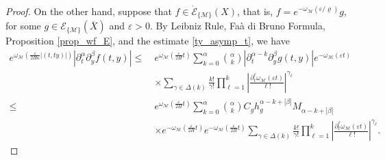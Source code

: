 \documentclass[11pt,reqno]{amsart}
\numberwithin{equation}{section}
\newcommand{\E}{{\mathcal{E}}}
\newcommand{\M}{{\mathcal{M}}} %
\newcommand{\X}{{\overline{X}}}
\begin{document}
\begin{proof}
	On the other hand, suppose that $f\in \dot{\E}_{\{\M\}}(X)$, that is, $f=e^{-\omega_\M(\varepsilon/\varrho)}g$, for some $g\in \E_{\{\M\}}(\X)$ and $\varepsilon>0$. By Leibniz Rule, Fa\`a di Bruno Formula, Proposition \ref{prop_wf_E}, and the estimate \eqref{ty_asymp_t}, we have
	\begin{align*}
		e^{\omega_\M\left(\tfrac{\varepsilon}{2H\kappa}|(t,ty)|\right)}|\partial_t^\alpha\partial_y^\beta f(t,y)| \leq\ & e^{\omega_\M \left(\tfrac{\varepsilon}{2H} t\right)} \sum_{k=0}^\alpha\binom{\alpha}{k} |\partial_t^{\alpha-k}\partial_y^\beta g(t,y)|e^{-\omega_\M(\varepsilon t)}\\
		& \times  \sum_{\gamma\in\Delta(k)}\frac{k!}{\gamma!}\prod_{\ell=1}^k\left|\frac{\partial_t^\ell \omega_\M(\varepsilon t)}{\ell!}\right|^{\gamma_\ell}\\
		\leq\ & e^{\omega_\M\left(\tfrac{\varepsilon}{2H}t\right)} \sum_{k=0}^\alpha\binom{\alpha}{k}  C_gh_g^{\alpha-k+|\beta|}M_{\alpha-k+|\beta|} \\
		& \times e^{-\omega_\M\left(\tfrac{\varepsilon}{2H} t\right)}e^{-\omega_\M\left(\tfrac{\varepsilon}{2H} t\right)} \sum_{\gamma\in\Delta(k)}\frac{k!}{\gamma!}\prod_{\ell=1}^k\left|\frac{\partial_t^\ell \omega_\M(\varepsilon t)}{\ell!}\right|^{\gamma_\ell}.
	\end{align*}
	

\end{proof}
\end{document}
